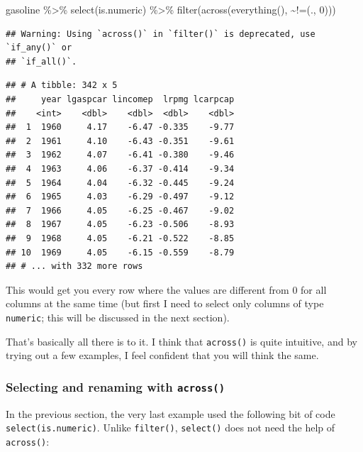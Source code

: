 \documentclass[
]{article}
\newenvironment{Shaded}{\begin{snugshade}}{\end{snugshade}}
\newcommand{\AttributeTok}[1]{\textcolor[rgb]{0.77,0.63,0.00}{#1}}
\newcommand{\DecValTok}[1]{\textcolor[rgb]{0.00,0.00,0.81}{#1}}
\newcommand{\FunctionTok}[1]{\textcolor[rgb]{0.00,0.00,0.00}{#1}}
\newcommand{\NormalTok}[1]{#1}
\newcommand{\SpecialCharTok}[1]{\textcolor[rgb]{0.00,0.00,0.00}{#1}}
\newcommand{\StringTok}[1]{\textcolor[rgb]{0.31,0.60,0.02}{#1}}
\begin{document}
\begin{Shaded}
\begin{Highlighting}[]
\NormalTok{gasoline }\SpecialCharTok{\%\textgreater{}\%}
  \FunctionTok{select}\NormalTok{(is.numeric) }\SpecialCharTok{\%\textgreater{}\%}  
  \FunctionTok{filter}\NormalTok{(}\FunctionTok{across}\NormalTok{(}\FunctionTok{everything}\NormalTok{(), }\SpecialCharTok{\textasciitilde{}}\StringTok{\textasciigrave{}}\AttributeTok{!=}\StringTok{\textasciigrave{}}\NormalTok{(., }\DecValTok{0}\NormalTok{)))}
\end{Highlighting}
\end{Shaded}

\begin{verbatim}
## Warning: Using `across()` in `filter()` is deprecated, use `if_any()` or
## `if_all()`.
\end{verbatim}

\begin{verbatim}
## # A tibble: 342 x 5
##     year lgaspcar lincomep  lrpmg lcarpcap
##    <int>    <dbl>    <dbl>  <dbl>    <dbl>
##  1  1960     4.17    -6.47 -0.335    -9.77
##  2  1961     4.10    -6.43 -0.351    -9.61
##  3  1962     4.07    -6.41 -0.380    -9.46
##  4  1963     4.06    -6.37 -0.414    -9.34
##  5  1964     4.04    -6.32 -0.445    -9.24
##  6  1965     4.03    -6.29 -0.497    -9.12
##  7  1966     4.05    -6.25 -0.467    -9.02
##  8  1967     4.05    -6.23 -0.506    -8.93
##  9  1968     4.05    -6.21 -0.522    -8.85
## 10  1969     4.05    -6.15 -0.559    -8.79
## # ... with 332 more rows
\end{verbatim}

This would get you every row where the values are different from 0 for all columns at the
same time (but first I need to select only columns of type \texttt{numeric}; this will be discussed
in the next section).

That's basically all there is to it. I think that \texttt{across()} is quite intuitive, and by trying out
a few examples, I feel confident that you will think the same.

\hypertarget{selecting-and-renaming-with-across}{%
\subsubsection{\texorpdfstring{Selecting and renaming with \texttt{across()}}{Selecting and renaming with across()}}\label{selecting-and-renaming-with-across}}

In the previous section, the very last example used the following bit of code \texttt{select(is.numeric)}.
Unlike \texttt{filter()}, \texttt{select()} does not need the help of \texttt{across()}:
\end{document}
